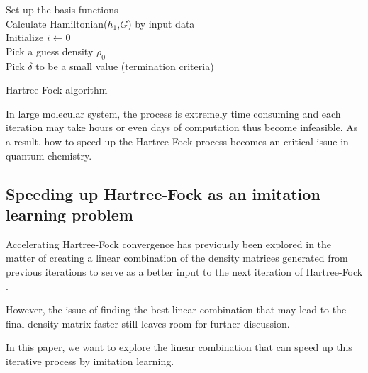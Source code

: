 \documentclass[twoside]{article}
\begin{document}

\begin{algorithm}[htb]
 \label{alg:hf}
	Set up the basis functions\\
	Calculate Hamiltonian($h_1$,$G$) by input data  \\
	Initialize $i \leftarrow	 0$ \\	
	Pick a guess density $\rho_0$ \\
	Pick $\delta$ to be a small value (termination criteria) \\
 \caption{Hartree-Fock algorithm}
\end{algorithm}

In large molecular system, the process is extremely time consuming and each iteration may take hours or even days of computation thus become infeasible. 
As a result, how to speed up the Hartree-Fock process becomes an critical issue in quantum chemistry.



\subsection{Speeding up Hartree-Fock as an imitation learning problem}


Accelerating Hartree-Fock convergence has previously been explored in the matter of creating a linear combination of the density matrices generated from previous iterations to serve as a better input to the next iteration of Hartree-Fock \cite{Pulay1980}. 


However, the issue of finding the best linear combination that may lead to the final density matrix faster still leaves room for further discussion.

In this paper,
we want to explore the linear combination that can speed up this iterative process by imitation learning. 
\end{document}
